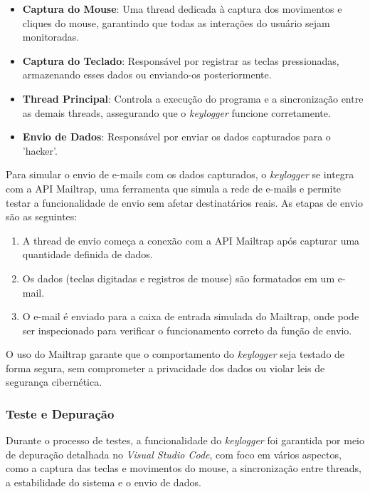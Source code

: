 \documentclass[12pt]{article}
\begin{document}
\begin{itemize}
    \item \textbf{Captura do Mouse}: Uma thread dedicada à captura dos movimentos e cliques do mouse, garantindo que todas as interações do usuário sejam monitoradas.
    \item \textbf{Captura do Teclado}: Responsável por registrar as teclas pressionadas, armazenando esses dados ou enviando-os posteriormente.
    \item \textbf{Thread Principal}: Controla a execução do programa e a sincronização entre as demais threads, assegurando que o \textit{keylogger} funcione corretamente.
    \item \textbf{Envio de Dados}: Responsável por enviar os dados capturados para o 'hacker'.
\end{itemize}

Para simular o envio de e-mails com os dados capturados, o \textit{keylogger} se integra com a API Mailtrap, uma ferramenta que simula a rede de e-mails e permite testar a funcionalidade de envio sem afetar destinatários reais. As etapas de envio são as seguintes:

\begin{enumerate}
    \item A thread de envio começa a conexão com a API Mailtrap após capturar uma quantidade definida de dados.
    \item Os dados (teclas digitadas e registros de mouse) são formatados em um e-mail.
    \item O e-mail é enviado para a caixa de entrada simulada do Mailtrap, onde pode ser inspecionado para verificar o funcionamento correto da função de envio.
\end{enumerate}

O uso do Mailtrap garante que o comportamento do \textit{keylogger} seja testado de forma segura, sem comprometer a privacidade dos dados ou violar leis de segurança cibernética.

\subsubsection{Teste e Depuração}

Durante o processo de testes, a funcionalidade do \textit{keylogger} foi garantida por meio de depuração detalhada no \textit{Visual Studio Code}, com foco em vários aspectos, como a captura das teclas e movimentos do mouse, a sincronização entre threads, a estabilidade do sistema e o envio de dados.
\end{document}
